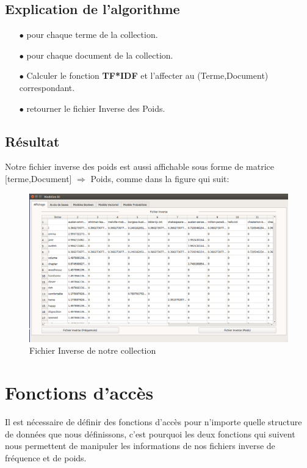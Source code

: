 \documentclass[12pt,a4paper,oneside]{article}
\begin{document}
\subsection{Explication de l'algorithme}
\begin{itemize}
	\item[$\bullet$] pour chaque terme de la collection.
	\item[$\bullet$] pour chaque document de la collection.
	\item[$\bullet$] Calculer le fonction \textbf{TF*IDF} et l'affecter au (Terme,Document) correspondant.
	\item[$\bullet$] retourner le fichier Inverse des Poids.
\end{itemize} 

\subsection{Résultat}
Notre fichier inverse des poids est aussi affichable sous forme de matrice [terme,Document] $\Rightarrow$ Poids, comme dans la figure qui suit:

	\begin{figure}[H]
		\centering
		\includegraphics[scale=0.35]{images/fichierP.png}
		\caption{Fichier Inverse de notre collection}
	\end{figure}




\newpage

\section{Fonctions d'accès}
Il est nécessaire de définir des fonctions d'accès pour n'importe quelle structure de données que nous définissons, c'est pourquoi les deux fonctions qui suivent nous permettent de manipuler les informations de nos fichiers inverse de fréquence et de poids.
\end{document}
